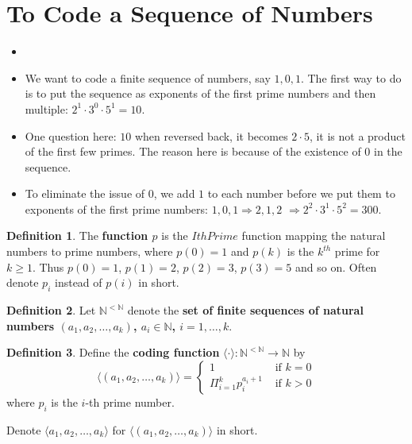 \documentclass[11pt,letterpaper]{book}
\theoremstyle{definition}
\newtheorem{definition}{Definition}[section]
\begin{document}
\section{To Code a Sequence of Numbers}


\begin{itemize}

\item[]
\item{We want to code a finite sequence of numbers, say $1,0,1$. The
first way to do is to put the sequence as exponents of the first prime
numbers and then multiple: $2^1 \cdot 3^0 \cdot 5^1 = 10$.}
\item{One question here: $10$ when reversed back, it becomes $2 \cdot
5$, it is not a product of the first few primes. The reason here is
because of the existence of $0$ in the sequence.}
\item{To eliminate the issue of $0$, we add $1$ to each number before we
put them to exponents of the first prime numbers: $1, 0, 1 \Rightarrow
2, 1, 2$ $ \Rightarrow  2^2 \cdot 3^1 \cdot 5^2 = 300 $.}

\end{itemize}


\begin{definition}
\label{def:IthPrime_func}
The \textbf{function $p$} is the $IthPrime$ function mapping the natural numbers to prime
numbers, where $p(0)=1$ and $p(k)$ is the $k^{th}$ prime for $k \geq 1$.
Thus $p(0)=1$, $p(1)=2$, $p(2)=3$, $p(3)=5$ and so on. Often denote
$p_i$ instead of $p(i)$ in short.
\end{definition}

\begin{definition}
Let $\mathbb{N}^{< \mathbb{N}}$ denote the \textbf{set of finite sequences of natural numbers $(a_1, a_2, \ldots, a_k)$, $a_i \in \mathbb{N}$, $i = 1, \ldots, k$}.
\end{definition}

\begin{definition}\label{def:coding_func}
Define the \textbf{coding function} $ \langle \cdot \rangle : \mathbb{N}^{< \mathbb{N}}
\rightarrow \mathbb{N}$ by
\begin{equation}
\langle (a_1, a_2, \ldots, a_k) \rangle =
\begin{cases}
1 & \text{ if } k =0 \\
\Pi^k _{i=1} p_i ^{a_i + 1} & \text{ if } k > 0
\end{cases}
\nonumber
\end{equation}
where $p_i$ is the $i$-th prime number.

Denote $\langle a_1, a_2, \ldots, a_k \rangle$ for $\langle (a_1, a_2, \ldots, a_k) \rangle$ in
short.
\end{definition}
\end{document}
